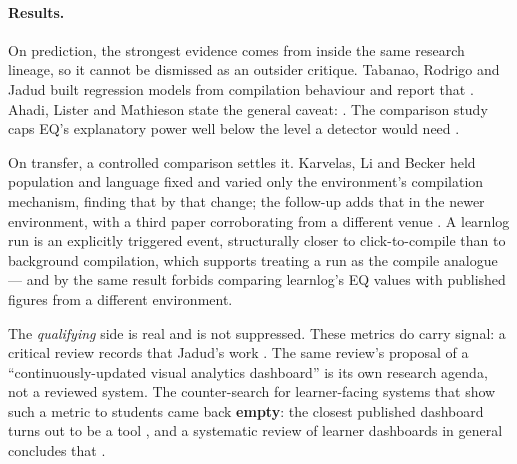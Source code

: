 \paragraph{Results.}
On prediction, the strongest evidence comes from inside the same research
lineage, so it cannot be dismissed as an outsider critique.  Tabanao,
Rodrigo and Jadud built regression models from compilation behaviour and
report that .  Ahadi, Lister and Mathieson state
the general caveat: .  The comparison study caps
EQ's explanatory power well below the level a detector would need
\autocite{svabensky2024comparison}.

On transfer, a controlled comparison settles it.  Karvelas, Li and Becker
held population and language fixed and varied only the environment's
compilation mechanism, finding that
 by that change; the follow-up
adds that  in the
newer environment, with a third paper corroborating from a different venue
\autocite{karvelas2020compilemuch}.  A learnlog run is an explicitly
triggered event, structurally closer to click-to-compile than to background
compilation, which supports treating a run as the compile analogue --- and
by the same result forbids comparing learnlog's EQ values with published
figures from a different environment.

The \emph{qualifying} side is real and is not suppressed.  These metrics do
carry signal: a critical review records that Jadud's work
.  The same review's proposal of a
\enquote{continuously-updated visual analytics dashboard} is its own
research agenda, not a reviewed system.  The counter-search for learner-facing
systems that show such a metric to students came back \textbf{empty}: the
closest published dashboard turns out to be a tool
, and
a systematic review of learner dashboards in general concludes that
.

